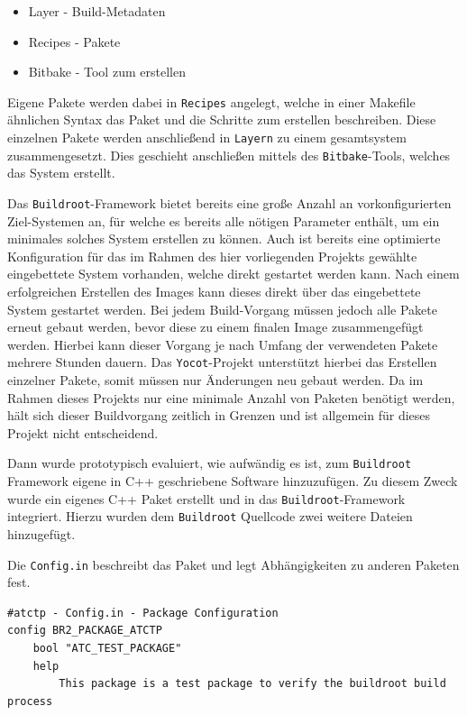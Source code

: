 \begin{itemize}
\tightlist
\item
  Layer - Build-Metadaten
\item
  Recipes - Pakete
\item
  Bitbake - Tool zum erstellen
\end{itemize}

Eigene Pakete werden dabei in \passthrough{\lstinline!Recipes!}
angelegt, welche in einer Makefile ähnlichen Syntax das Paket und die
Schritte zum erstellen beschreiben. Diese einzelnen Pakete werden
anschließend in \passthrough{\lstinline!Layern!} zu einem gesamtsystem
zusammengesetzt. Dies geschieht anschließen mittels des
\passthrough{\lstinline!Bitbake!}-Tools, welches das System erstellt.

Das \passthrough{\lstinline!Buildroot!}-Framework bietet bereits eine
große Anzahl an vorkonfigurierten Ziel-Systemen an, für welche es
bereits alle nötigen Parameter enthält, um ein minimales solches System
erstellen zu können. Auch ist bereits eine optimierte Konfiguration für
das im Rahmen des hier vorliegenden Projekts gewählte eingebettete
System vorhanden, welche direkt gestartet werden kann. Nach einem
erfolgreichen Erstellen des Images kann dieses direkt über das
eingebettete System gestartet werden. Bei jedem Build-Vorgang müssen
jedoch alle Pakete erneut gebaut werden, bevor diese zu einem finalen
Image zusammengefügt werden. Hierbei kann dieser Vorgang je nach Umfang
der verwendeten Pakete mehrere Stunden dauern. Das
\passthrough{\lstinline!Yocot!}-Projekt unterstützt hierbei das
Erstellen einzelner Pakete, somit müssen nur Änderungen neu gebaut
werden. Da im Rahmen dieses Projekts nur eine minimale Anzahl von
Paketen benötigt werden, hält sich dieser Buildvorgang zeitlich in
Grenzen und ist allgemein für dieses Projekt nicht entscheidend.

Dann wurde prototypisch evaluiert, wie aufwändig es ist, zum
\passthrough{\lstinline!Buildroot!} Framework eigene in C++ geschriebene
Software hinzuzufügen. Zu diesem Zweck wurde ein eigenes C++ Paket
erstellt und in das \passthrough{\lstinline!Buildroot!}-Framework
integriert. Hierzu wurden dem \passthrough{\lstinline!Buildroot!}
Quellcode zwei weitere Dateien hinzugefügt.

Die \passthrough{\lstinline!Config.in!} beschreibt das Paket und legt
Abhängigkeiten zu anderen Paketen fest.

\begin{lstlisting}
#atctp - Config.in - Package Configuration
config BR2_PACKAGE_ATCTP
    bool "ATC_TEST_PACKAGE"
    help
        This package is a test package to verify the buildroot build process
\end{lstlisting}

